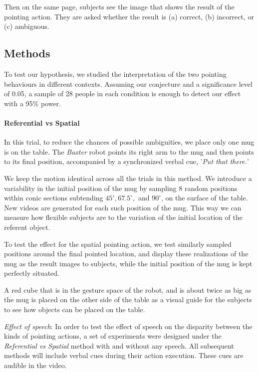Then on the same page, subjects see the image that shows the result of the pointing action. They are asked whether the result is (a) correct, (b) incorrect, or (c) ambiguous.  



\subsection{Methods}

To test our hypothesis, we studied the interpretation of the two pointing behaviours in different contexts. Assuming our conjecture and a significance level of 0.05, a sample of 28 people in each condition is enough to detect our effect with a 95\% power.

\paragraph{Referential vs Spatial}
In this trial, to reduce the chances of possible ambiguities, we place only one mug is on the table. The \textit{Baxter} robot points its right arm to the mug and then points to its final position, accompanied by a synchronized verbal cue, '\textit{Put that there.}'


We keep the motion identical across all the trials in this method. 
We introduce a variability in the initial position of the mug by sampling $8$ random positions within conic sections subtending $45^{\circ} , 67.5^{\circ}, $ and $90^{\circ}$, on the surface of the table. New videos are generated for each such position of the mug.
This way we can measure how flexible subjects are to the variation of the initial location of the referent object. 

To test the effect for the spatial pointing action, we test similarly sampled positions around the final pointed location, and display these realizations of the mug as the result images to subjects, while the initial position of the mug is kept perfectly situated. 

 A red cube that is in the gesture space of the robot, and is about twice as big as the mug is placed on the other side of the table as a visual guide for the subjects to see how objects can be placed on the table. 

\noindent\textit{Effect of speech}: In order to test the effect of speech on the disparity between the kinds of pointing actions, a set of experiments were designed under the \textit{Referential vs Spatial} method with and without any speech. All subsequent methods will include verbal cues during their action execution. These cues are audible in the video.


